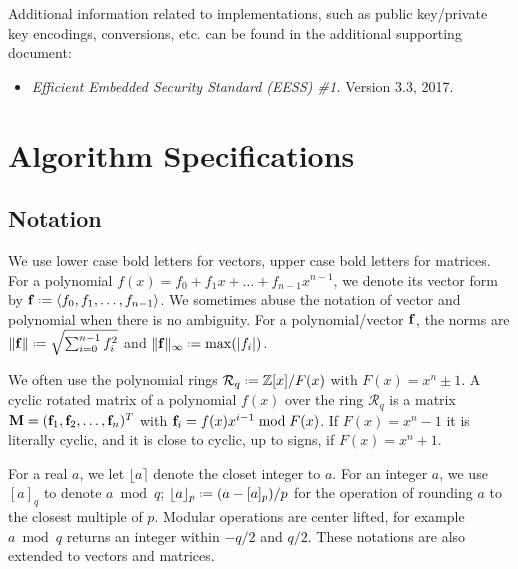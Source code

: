 \documentclass{llncs}
\newcommand{\Rcal}{{\mathcal R}}
\newcommand{\ZZ}{\mathbb{Z}}
\newcommand{\bff}{{\bf f}}
\newcommand{\bfM}{{\bf M}}
\newcommand{\<}{\langle}
\renewcommand{\>}{\rangle}
\newcommand*{\defeq}{\mathrel{\vcenter{\baselineskip0.5ex \lineskiplimit0pt
                     \hbox{\scriptsize.}\hbox{\scriptsize.}}}%
                     =}
\begin{document}
Additional information related to implementations, such as public key/private key encodings, 
conversions, etc. can be found in the additional supporting document:

\begin{itemize}
\item {\em Efficient Embedded Security Standard (EESS) \#1.} Version 3.3, 2017.
\end{itemize}


\section{Algorithm Specifications}
\subsection{Notation}

We use lower case bold letters for vectors, upper case bold letters for matrices.
For a polynomial $f(x) = f_0+f_1x+\dots+ f_{n-1}x^{n-1}$, 
we denote its vector form by $\bff \defeq \left<f_0, f_1, \dots, f_{n-1}\right>$.  We sometimes abuse the notation of vector and polynomial when there is no ambiguity.
For a polynomial/vector $\bff$, the norms are $\|\bff\| \defeq \sqrt{\sum_{i=0}^{n-1}f_i^2}$ and $\|\bff\|_\infty \defeq \max(|f_i|)$. 

We often use the polynomial rings $\Rcal_q \defeq \ZZ[x]/F(x)$ with $F(x) = x^n\pm 1$. %
A cyclic rotated matrix of a polynomial $f(x)$ over the ring $\Rcal_q$
is a matrix $\bfM = (\bff_1,\bff_2,\dots,\bff_n)^T$ with $\bff_i = f(x)x^{i-1}\bmod F(x)$.
If  $F(x) = x^n- 1$ it is literally cyclic, and it is close to cyclic, up to signs, if $F(x) = x^n + 1$.

For a real $a$, we let 
$\lfloor a\rceil$ denote the closet integer to $a$.
 For an integer $a$, we use
$[a]_q$ to denote $a\bmod q$; $\lfloor a\rfloor_p \defeq (a - [a]_p )/p$ for the operation of rounding $a$ to the closest multiple of $p$. 
Modular operations are center lifted, for example $a\bmod q$ returns an integer within $-q/2$ and $q/2$. These notations are also extended to vectors and matrices.

\end{document}
